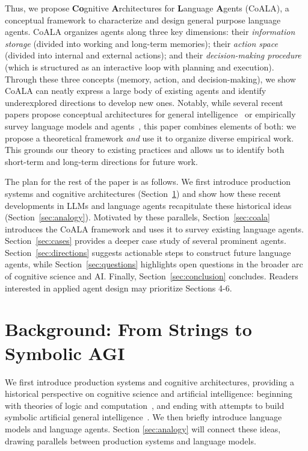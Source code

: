 \documentclass[10pt]{article} %
\begin{document}
Thus, we propose \textbf{Co}gnitive \textbf{A}rchitectures for \textbf{L}anguage \textbf{A}gents (CoALA), a conceptual framework to characterize and design general purpose language agents.
CoALA organizes agents along three key dimensions: their \textit{information storage} (divided into working and long-term memories); their \textit{action space} (divided into internal and external actions); and their \textit{decision-making procedure} (which is structured as an interactive loop with planning and execution). Through these three concepts (memory, action, and decision-making), we show CoALA can neatly express a large body of existing agents and identify underexplored directions to develop new ones.
Notably, while several recent papers propose conceptual architectures for general intelligence~\citep{lecun2022path, mcclelland2019extending} or empirically survey language models and agents~\citep{mialon2023augmented, weng2023prompt, wang2023survey}, this paper combines elements of both: we propose a theoretical framework \emph{and} use it to organize diverse empirical work. This grounds our theory to existing practices and allows us to identify both short-term and long-term directions for future work.

The plan for the rest of the paper is as follows. We first introduce production systems and cognitive architectures (Section~\ref{sec:background}) and show how these recent developments in LLMs and language agents recapitulate these historical ideas (Section~\ref{sec:analogy}). Motivated by these parallels, Section~\ref{sec:coala} introduces the CoALA framework and uses it to survey existing language agents. 
Section~\ref{sec:cases} provides a deeper case study of several prominent agents. Section~\ref{sec:directions} suggests actionable steps to construct future language agents, while Section~\ref{sec:questions} highlights open questions in the broader arc of cognitive science and AI. Finally, Section~\ref{sec:conclusion} concludes. Readers interested in applied agent design may prioritize Sections 4-6. 




\section{Background: From Strings to Symbolic AGI}
\label{sec:background}
We first introduce production systems and cognitive architectures, providing a historical perspective on cognitive science and artificial intelligence: beginning with theories of logic and computation~\citep{post1943formal}, and ending with attempts to build symbolic artificial general intelligence~\citep{newell1989symbolic}. We then briefly introduce language models and language agents. Section \ref{sec:analogy} will connect these ideas, drawing parallels between production systems and language models.
\end{document}
